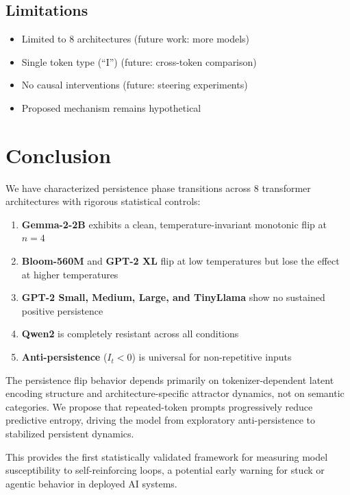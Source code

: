 \documentclass[12pt,a4paper]{article}
\begin{document}
\subsection{Limitations}

\begin{itemize}[noitemsep]
    \item Limited to 8 architectures (future work: more models)
    \item Single token type (``I'') (future: cross-token comparison)
    \item No causal interventions (future: steering experiments)
    \item Proposed mechanism remains hypothetical
\end{itemize}

\section{Conclusion}

We have characterized persistence phase transitions across 8 transformer architectures with rigorous statistical controls:

\begin{enumerate}[noitemsep]
    \item \textbf{Gemma-2-2B} exhibits a clean, temperature-invariant monotonic flip at $n=4$
    \item \textbf{Bloom-560M} and \textbf{GPT-2 XL} flip at low temperatures but lose the effect at higher temperatures
    \item \textbf{GPT-2 Small, Medium, Large, and TinyLlama} show no sustained positive persistence
    \item \textbf{Qwen2} is completely resistant across all conditions
    \item \textbf{Anti-persistence} ($I_t < 0$) is universal for non-repetitive inputs
\end{enumerate}

The persistence flip behavior depends primarily on tokenizer-dependent latent encoding structure and architecture-specific attractor dynamics, not on semantic categories. We propose that repeated-token prompts progressively reduce predictive entropy, driving the model from exploratory anti-persistence to stabilized persistent dynamics.

This provides the first statistically validated framework for measuring model susceptibility to self-reinforcing loops, a potential early warning for stuck or agentic behavior in deployed AI systems.
\end{document}
